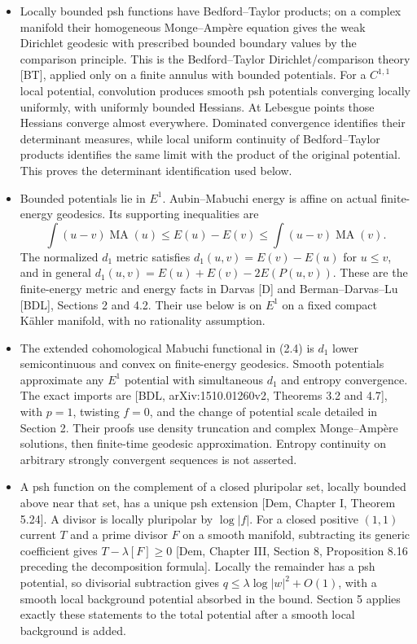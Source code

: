 \documentclass[
  11pt,
]{article}
\providecommand{\tightlist}{%
  \setlength{\itemsep}{0pt}\setlength{\parskip}{0pt}}
\begin{document}
\begin{itemize}
\tightlist
\item
  Locally bounded psh functions have Bedford--Taylor products; on a
  complex manifold their homogeneous Monge--Ampère equation gives the
  weak Dirichlet geodesic with prescribed bounded boundary values by the
  comparison principle. This is the Bedford--Taylor Dirichlet/comparison
  theory {[}BT{]}, applied only on a finite annulus with bounded
  potentials. For a \(C^{1,1}\) local potential, convolution produces
  smooth psh potentials converging locally uniformly, with uniformly
  bounded Hessians. At Lebesgue points those Hessians converge almost
  everywhere. Dominated convergence identifies their determinant
  measures, while local uniform continuity of Bedford--Taylor products
  identifies the same limit with the product of the original potential.
  This proves the determinant identification used below.
\item
  Bounded potentials lie in \(E^1\). Aubin--Mabuchi energy is affine on
  actual finite-energy geodesics. Its supporting inequalities are \[
  \int(u-v)\operatorname{MA}(u)\leq E(u)-E(v)
     \leq\int(u-v)\operatorname{MA}(v).                 \tag{1.7}
  \] The normalized \(d_1\) metric satisfies \(d_1(u,v)=E(v)-E(u)\) for
  \(u\leq v\), and in general \(d_1(u,v)=E(u)+E(v)-2E(P(u,v))\). These
  are the finite-energy metric and energy facts in Darvas {[}D{]} and
  Berman--Darvas--Lu {[}BDL{]}, Sections 2 and 4.2. Their use below is
  on \(E^1\) on a fixed compact Kähler manifold, with no rationality
  assumption.
\item
  The extended cohomological Mabuchi functional in (2.4) is \(d_1\)
  lower semicontinuous and convex on finite-energy geodesics. Smooth
  potentials approximate any \(E^1\) potential with simultaneous \(d_1\)
  and entropy convergence. The exact imports are {[}BDL,
  arXiv:1510.01260v2, Theorems 3.2 and 4.7{]}, with \(p=1\), twisting
  \(f=0\), and the change of potential scale detailed in Section 2.
  Their proofs use density truncation and complex Monge--Ampère
  solutions, then finite-time geodesic approximation. Entropy continuity
  on arbitrary strongly convergent sequences is not asserted.
\item
  A psh function on the complement of a closed pluripolar set, locally
  bounded above near that set, has a unique psh extension {[}Dem,
  Chapter I, Theorem 5.24{]}. A divisor is locally pluripolar by
  \(\log|f|\). For a closed positive \((1,1)\) current \(T\) and a prime
  divisor \(F\) on a smooth manifold, subtracting its generic
  coefficient gives \(T-\lambda[F]\geq0\) {[}Dem, Chapter III, Section
  8, Proposition 8.16 preceding the decomposition formula{]}. Locally
  the remainder has a psh potential, so divisorial subtraction gives
  \(q\leq\lambda\log|w|^2+O(1)\), with a smooth local background
  potential absorbed in the bound. Section 5 applies exactly these
  statements to the total potential after a smooth local background is
  added.
\end{itemize}
\end{document}
